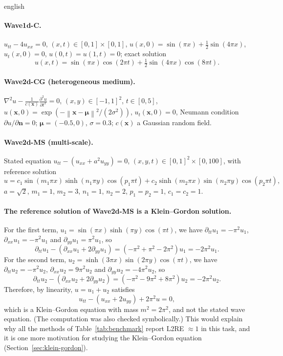 \documentclass[11pt,letterpaper,twoside,openright]{book} %
\newcommand{\norm}[1]{\left\lVert #1 \right\rVert}
\begin{document}
\begin{hyphenrules}{english}
\paragraph{Wave1d-C.} $u_{tt}-4u_{xx}=0$, $(x,t)\in[0,1]\times[0,1]$,
$u(x,0)=\sin(\pi x)+\frac12\sin(4\pi x)$, $u_t(x,0)=0$, $u(0,t)=u(1,t)=0$; exact solution
\[
  u(x,t)=\sin(\pi x)\cos(2\pi t)+\tfrac12\sin(4\pi x)\cos(8\pi t).
\]

\paragraph{Wave2d-CG (heterogeneous medium).} $\nabla^2u-\frac{1}{c(\mathbf{x})}\frac{\partial^2u}{\partial t^2}=0$,
$(x,y)\in[-1,1]^2$, $t\in[0,5]$, $u(\mathbf{x},0)=\exp(-\norm{\mathbf{x}-\bm\mu}^2/(2\sigma^2))$, $u_t(\mathbf{x},0)=0$, Neumann
condition $\partial u/\partial\mathbf{n}=0$; $\bm\mu=(-0.5,0)$, $\sigma=0.3$; $c(\mathbf{x})$ a Gaussian random field.

\paragraph{Wave2d-MS (multi-scale).} Stated equation $u_{tt}-(u_{xx}+a^2u_{yy})=0$,
$(x,y,t)\in[0,1]^2\times[0,100]$, with reference solution
\[
  u=c_1\sin(m_1\pi x)\sinh(n_1\pi y)\cos(p_1\pi t)+c_2\sinh(m_2\pi x)\sin(n_2\pi y)\cos(p_2\pi t),
\]
$a=\sqrt2$, $m_1=1$, $m_2=3$, $n_1=1$, $n_2=2$, $p_1=p_2=1$, $c_1=c_2=1$.

\paragraph{The reference solution of Wave2d-MS is a Klein--Gordon solution.}
For the first term, $u_1=\sin(\pi x)\sinh(\pi y)\cos(\pi t)$, we have $\partial_{tt}u_1=-\pi^2u_1$,
$\partial_{xx}u_1=-\pi^2u_1$ and $\partial_{yy}u_1=\pi^2u_1$, so
\[
  \partial_{tt}u_1-(\partial_{xx}u_1+2\partial_{yy}u_1)=(-\pi^2+\pi^2-2\pi^2)u_1=-2\pi^2u_1.
\]
For the second term, $u_2=\sinh(3\pi x)\sin(2\pi y)\cos(\pi t)$, we have $\partial_{tt}u_2=-\pi^2u_2$,
$\partial_{xx}u_2=9\pi^2u_2$ and $\partial_{yy}u_2=-4\pi^2u_2$, so
\[
  \partial_{tt}u_2-(\partial_{xx}u_2+2\partial_{yy}u_2)=(-\pi^2-9\pi^2+8\pi^2)u_2=-2\pi^2u_2.
\]
Therefore, by linearity, $u=u_1+u_2$ satisfies
\begin{equation}
  u_{tt}-(u_{xx}+2u_{yy})+2\pi^2u=0,
  \label{eq:wave2dms-kg}
\end{equation}
which is a Klein--Gordon equation with mass $m^2=2\pi^2$, and not the stated wave equation. (The
computation was also checked symbolically.) This would explain why all the methods of
Table~\ref{tab:benchmark} report L2RE $\approx1$ in this task, and it is one more motivation for studying the
Klein--Gordon equation (Section~\ref{sec:klein-gordon}).


\end{hyphenrules}
\end{document}
